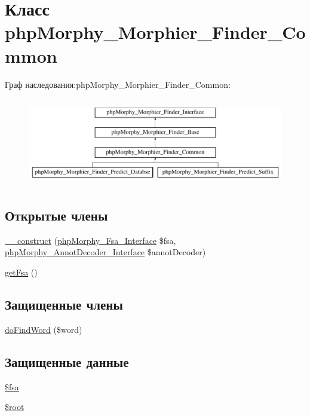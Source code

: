 \hypertarget{classphpMorphy__Morphier__Finder__Common}{
\section{Класс phpMorphy\_\-Morphier\_\-Finder\_\-Common}
\label{classphpMorphy__Morphier__Finder__Common}
}
Граф наследования:phpMorphy\_\-Morphier\_\-Finder\_\-Common:\begin{figure}[H]
\begin{center}
\leavevmode
\includegraphics[height=3.888889cm]{classphpMorphy__Morphier__Finder__Common}
\end{center}
\end{figure}
\subsection*{Открытые члены}
\begin{DoxyCompactItemize}
\item 
\hyperlink{classphpMorphy__Morphier__Finder__Common_afa077e4b7a35681601c947e77f814660}{\_\-\_\-construct} (\hyperlink{interfacephpMorphy__Fsa__Interface}{phpMorphy\_\-Fsa\_\-Interface} \$fsa, \hyperlink{interfacephpMorphy__AnnotDecoder__Interface}{phpMorphy\_\-AnnotDecoder\_\-Interface} \$annotDecoder)
\item 
\hyperlink{classphpMorphy__Morphier__Finder__Common_a2da6cc6f80ac0cf0579a74352824f41e}{getFsa} ()
\end{DoxyCompactItemize}
\subsection*{Защищенные члены}
\begin{DoxyCompactItemize}
\item 
\hyperlink{classphpMorphy__Morphier__Finder__Common_a9f0165dfe06a35436604c2aba0854c1c}{doFindWord} (\$word)
\end{DoxyCompactItemize}
\subsection*{Защищенные данные}
\begin{DoxyCompactItemize}
\item 
\hyperlink{classphpMorphy__Morphier__Finder__Common_affe8911bda0bcbc468932780c58ac620}{\$fsa}
\item 
\hyperlink{classphpMorphy__Morphier__Finder__Common_af347d478e3e6052b233a0ca64c2b8813}{\$root}
\end{DoxyCompactItemize}


